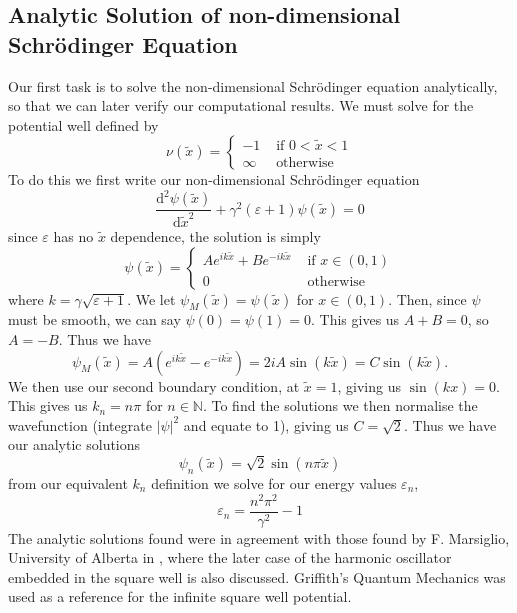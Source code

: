\documentclass[10pt,a4paper]{article}
\theoremstyle{definition}
\theoremstyle{remark}
\begin{document}
\subsection{Analytic Solution of non-dimensional Schr\"{o}dinger Equation}
\label{sec: analytic_solution}
Our first task is to solve the non-dimensional Schr\"{o}dinger equation analytically, so that we can later verify our computational results. We must solve for the potential well defined by
\begin{equation}
    \label{eq: square_well}
    \nu(\tilde{x}) = 
        \begin{cases}
            -1 & \text{ if } 0<\tilde{x}<1\\
            \infty & \text{ otherwise}
        \end{cases}
\end{equation}
To do this we first write our non-dimensional Schr\"{o}dinger equation
\begin{equation}
    \frac{\mathrm{d}^2\psi(\tilde{x})}{\mathrm{d}\tilde{x}^2} + \gamma^2(\varepsilon+1)\psi(\tilde{x}) = 0
\end{equation}
since $\varepsilon$ has no $\tilde{x}$ dependence, the solution is simply 
\begin{equation}
    \psi(\tilde{x}) = 
        \begin{cases}
            Ae^{ik\tilde{x}} + Be^{-ik\tilde{x}} & \text{ if }x\in(0,1)\\
            0 & \text{ otherwise}
        \end{cases}
\end{equation}
where $k = \gamma\sqrt{\varepsilon+1}$. We let $\psi_M(\tilde{x}) = \psi(\tilde{x})$ for $x\in (0,1)$. Then, since $\psi$ must be smooth, we can say $\psi(0)=\psi(1)=0$. This gives us $A+B=0$, so $A=-B$. Thus we have
\begin{equation}
    \psi_M(\tilde{x}) = A(e^{ik\tilde{x}}-e^{-ik\tilde{x}}) = 2iA\sin(k\tilde{x}) = C\sin(k\tilde{x}).
\end{equation}
We then use our second boundary condition, at $\tilde{x}=1$, giving us $\sin(kx) = 0$. This gives us $k_n = n\pi$ for $n\in\mathbb{N}$. To find the solutions we then normalise the wavefunction (integrate $|\psi|^2$ and equate to 1), giving us $C=\sqrt{2}$. Thus we have our analytic solutions
\begin{equation}
    \psi_n(\tilde{x}) = \sqrt{2}\sin(n\pi\tilde{x})
\end{equation}
from our equivalent $k_n$ definition we solve for our energy values $\varepsilon_n$,
\begin{equation}
    \varepsilon_n = \frac{n^2\pi^2}{\gamma^2}-1
\end{equation}
The analytic solutions found were in agreement with those found by F. Marsiglio, University of Alberta in \cite{article}, where the later case of the harmonic oscillator embedded in the square well is also discussed. Griffith's Quantum Mechanics \cite{Griffiths_Schroeter_2018} was used as a reference for the infinite square well potential.
\end{document}
